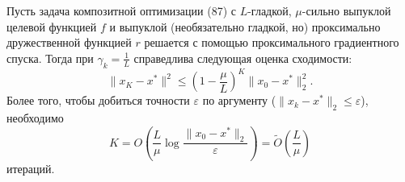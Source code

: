 \begin{theorem}
    Пусть задача композитной оптимизации (87) с $L$-гладкой, $\mu$-сильно выпуклой целевой функцией $f$ и выпуклой (необязательно гладкой, но) проксимально дружественной функцией $r$ решается с помощью проксимального градиентного спуска.
    Тогда при $\gamma_k = \frac{1}{L}$ справедлива следующая оценка сходимости:
    $$ \|x_K - x^*\|^2 \leq \left( 1 - \frac{\mu}{L} \right)^K \|x_0 - x^*\|_2^2. $$
    Более того, чтобы добиться точности $\varepsilon$ по аргументу ($\|x_k - x^*\|_2 \leq \varepsilon$), необходимо
    $$ K = O\left( \frac{L}{\mu} \log \frac{\|x_0 - x^*\|_2}{\varepsilon} \right) = \tilde{O}\left( \frac{L}{\mu} \right) $$
    итераций.
\end{theorem}
